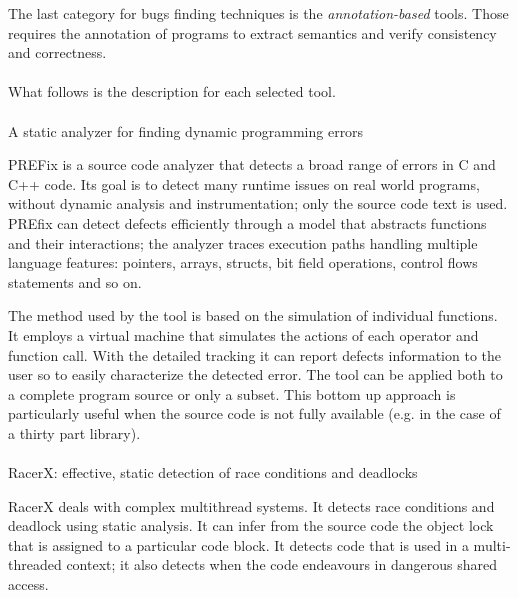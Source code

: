 The last category for bugs finding techniques is the \emph{annotation-based} tools. Those requires the annotation of programs to extract semantics and verify consistency and correctness.
\\
\\
What follows is the description for each selected tool.
\\%
\\
 \cite{bush2000static} A static analyzer for finding dynamic programming errors

PREFix is a source code analyzer that detects a broad range of errors in C and C++ code.
Its goal is to detect many runtime issues on real world programs, without dynamic analysis and instrumentation; only the source code text is used. PREfix can detect defects efficiently through a model that abstracts functions and their interactions; the analyzer traces execution paths handling multiple language features: pointers, arrays, structs, bit field operations, control flows statements and so on.

The method used by the tool is based on the simulation of individual functions. It employs a virtual machine that simulates the actions of each operator and function call. With the detailed tracking it can report defects information to the user so to easily characterize the detected error.
The tool can be applied both to a complete program source or only a subset. This bottom up approach is particularly useful when the source code is not fully available (e.g. in the case of a thirty part library).
\\
\\
 \cite{engler2003racerx} RacerX: effective, static detection of race conditions and deadlocks

RacerX deals with complex multithread systems. It detects race conditions and deadlock using static analysis.
It can infer from the source code the object lock that is assigned to a particular code block. It detects code that is used in a multi-threaded context; it also detects when the code endeavours in dangerous shared access. 

